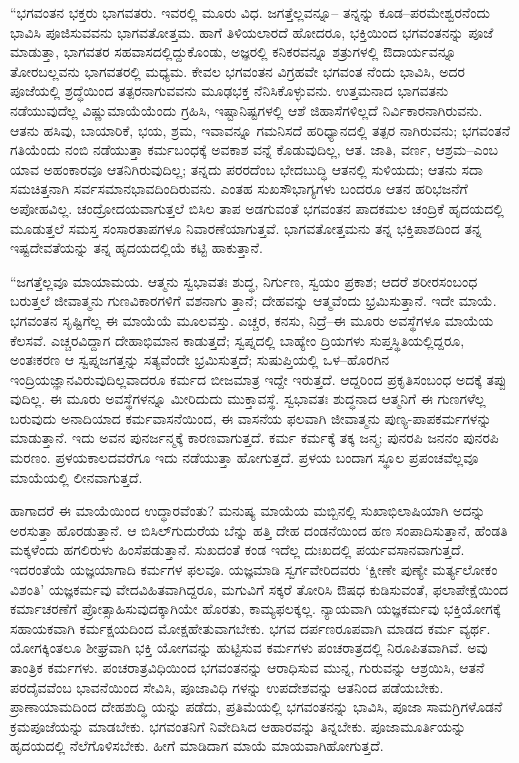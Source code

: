 “ಭಗವಂತನ ಭಕ್ತರು ಭಾಗವತರು. ಇವರಲ್ಲಿ ಮೂರು ವಿಧ. ಜಗತ್ತೆಲ್ಲವನ್ನೂ– ತನ್ನನ್ನು ಕೂಡ–ಪರಮೇಶ್ವರನೆಂದು ಭಾವಿಸಿ ಪೂಜಿಸುವವನು ಭಾಗವತೋತ್ತಮ. ಹಾಗೆ ತಿಳಿಯಲಾರದೆ ಹೋದರೂ, ಭಕ್ತಿಯಿಂದ ಭಗವಂತನನ್ನು ಪೂಜೆ ಮಾಡುತ್ತಾ, ಭಾಗವತರ ಸಹವಾಸದಲ್ಲಿದ್ದುಕೊಂಡು, ಅಜ್ಞರಲ್ಲಿ ಕನಿಕರವನ್ನೂ ಶತ್ರುಗಳಲ್ಲಿ ಔದಾರ್ಯವನ್ನೂ ತೋರಬಲ್ಲವನು ಭಾಗವತರಲ್ಲಿ ಮಧ್ಯಮ. ಕೇವಲ ಭಗವಂತನ ವಿಗ್ರಹವೇ ಭಗವಂತ ನೆಂದು ಭಾವಿಸಿ, ಅದರ ಪೂಜೆಯಲ್ಲಿ ಶ್ರದ್ಧೆಯಿಂದ ತತ್ಪರನಾಗುವವನು ಮೂಢಭಕ್ತ ನೆನಿಸಿಕೊಳ್ಳುವನು. ಉತ್ತಮನಾದ ಭಾಗವತನು ನಡೆಯುವುದೆಲ್ಲ ವಿಷ್ಣುಮಾಯೆಯೆಂದು ಗ್ರಹಿಸಿ, ಇಷ್ಟಾನಿಷ್ಟಗಳಲ್ಲಿ ಆಶೆ ಜಿಹಾಸೆಗಳಿಲ್ಲದೆ ನಿರ್ವಿಕಾರನಾಗಿರುವನು. ಆತನು ಹಸಿವು, ಬಾಯಾರಿಕೆ, ಭಯ, ಶ್ರಮ, ಇವಾವನ್ನೂ ಗಮನಿಸದೆ ಹರಿಧ್ಯಾನದಲ್ಲಿ ತತ್ಪರ ನಾಗಿರುವನು; ಭಗವಂತನೆ ಗತಿಯೆಂದು ನಂಬಿ ನಡೆಯುತ್ತಾ ಕರ್ಮಬಂಧಕ್ಕೆ ಅವಕಾಶ ವನ್ನೆ ಕೊಡುವುದಿಲ್ಲ, ಆತ. ಜಾತಿ, ವರ್ಣ, ಆಶ್ರಮ–ಎಂಬ ಯಾವ ಅಹಂಕಾರವೂ ಆತನಿಗಿರುವುದಿಲ್ಲ; ತನ್ನದು ಪರರದೆಂಬ ಭೇದಬುದ್ಧಿ ಆತನಲ್ಲಿ ಸುಳಿಯದು; ಆತನು ಸದಾ ಸಮಚಿತ್ತನಾಗಿ ಸರ್ವಸಮಾನಭಾವದಿಂದಿರುವನು. ಎಂತಹ ಸುಖಸೌಭಾಗ್ಯಗಳು ಬಂದರೂ ಆತನ ಹರಿಭಜನೆಗೆ ಅಪೋಹವಿಲ್ಲ. ಚಂದ್ರೋದಯವಾಗುತ್ತಲೆ ಬಿಸಿಲ ತಾಪ ಅಡಗುವಂತೆ ಭಗವಂತನ ಪಾದಕಮಲ ಚಂದ್ರಿಕೆ ಹೃದಯದಲ್ಲಿ ಮೂಡುತ್ತಲೆ ಸಮಸ್ತ ಸಂಸಾರತಾಪಗಳೂ ನಿವಾರಣೆಯಾಗುತ್ತವೆ. ಭಾಗವತೋತ್ತಮನು ತನ್ನ ಭಕ್ತಿಪಾಶದಿಂದ ತನ್ನ ಇಷ್ಟದೇವತೆಯನ್ನು ತನ್ನ ಹೃದಯದಲ್ಲಿಯೆ ಕಟ್ಟಿ ಹಾಕುತ್ತಾನೆ.

“ಜಗತ್ತೆಲ್ಲವೂ ಮಾಯಾಮಯ. ಆತ್ಮನು ಸ್ವಭಾವತಃ ಶುದ್ಧ, ನಿರ್ಗುಣ, ಸ್ವಯಂ ಪ್ರಕಾಶ; ಆದರೆ ಶರೀರಸಂಬಂಧ ಬರುತ್ತಲೆ ಜೀವಾತ್ಮನು ಗುಣವಿಕಾರಗಳಿಗೆ ವಶನಾಗು ತ್ತಾನೆ; ದೇಹವನ್ನು ಆತ್ಮವೆಂದು ಭ್ರಮಿಸುತ್ತಾನೆ. ಇದೇ ಮಾಯೆ. ಭಗವಂತನ ಸೃಷ್ಟಿಗೆಲ್ಲ ಈ ಮಾಯೆಯೆ ಮೂಲವಸ್ತು. ಎಚ್ಚರ, ಕನಸು, ನಿದ್ರೆ–ಈ ಮೂರು ಅವಸ್ಥೆಗಳೂ ಮಾಯೆಯ ಕೆಲಸವೆ. ಎಚ್ಚರವಿದ್ದಾಗ ದೇಹಾಭಿಮಾನ ಕಾಡುತ್ತದೆ; ಸ್ವಪ್ನದಲ್ಲಿ ಬಾಹ್ಯೇಂ ದ್ರಿಯಗಳು ಸುಪ್ತಸ್ಥಿತಿಯಲ್ಲಿದ್ದರೂ, ಅಂತಃಕರಣ ಆ ಸ್ವಪ್ನಜಗತ್ತನ್ನು ಸತ್ಯವೆಂದೇ ಭ್ರಮಿಸುತ್ತದೆ; ಸುಷುಪ್ತಿಯಲ್ಲಿ ಒಳ–ಹೊರಗಿನ ಇಂದ್ರಿಯಜ್ಞಾನವಿರುವುದಿಲ್ಲವಾದರೂ ಕರ್ಮದ ಬೀಜಮಾತ್ರ ಇದ್ದೇ ಇರುತ್ತದೆ. ಆದ್ದರಿಂದ ಪ್ರಕೃತಿಸಂಬಂಧ ಅದಕ್ಕೆ ತಪ್ಪು ವುದಿಲ್ಲ. ಈ ಮೂರು ಅವಸ್ಥೆಗಳನ್ನೂ ಮೀರಿದುದು ಮುಕ್ತಾವಸ್ಥೆ. ಸ್ವಭಾವತಃ ಶುದ್ಧನಾದ ಆತ್ಮನಿಗೆ ಈ ಗುಣಗಳೆಲ್ಲ ಬರುವುದು ಅನಾದಿಯಾದ ಕರ್ಮವಾಸನೆಯಿಂದ, ಈ ವಾಸನೆಯ ಫಲವಾಗಿ ಜೀವಾತ್ಮನು ಪುಣ್ಯ-ಪಾಪಕರ್ಮಗಳನ್ನು ಮಾಡುತ್ತಾನೆ. ಇದು ಅವನ ಪುನರ್ಜನ್ಮಕ್ಕೆ ಕಾರಣವಾಗುತ್ತದೆ. ಕರ್ಮ ಕರ್ಮಕ್ಕೆ ತಕ್ಕ ಜನ್ಮ; ಪುನರಪಿ ಜನನಂ ಪುನರಪಿ ಮರಣಂ. ಪ್ರಳಯಕಾಲದವರೆಗೂ ಇದು ನಡೆಯುತ್ತಾ ಹೋಗುತ್ತದೆ. ಪ್ರಳಯ ಬಂದಾಗ ಸ್ಥೂಲ ಪ್ರಪಂಚವೆಲ್ಲವೂ ಮಾಯೆಯಲ್ಲಿ ಲೀನವಾಗುತ್ತದೆ.

ಹಾಗಾದರೆ ಈ ಮಾಯೆಯಿಂದ ಉದ್ಧಾರವೆಂತು? ಮನುಷ್ಯ ಮಾಯೆಯ ಮಬ್ಬಿನಲ್ಲಿ ಸುಖಾಭಿಲಾಷಿಯಾಗಿ ಅದನ್ನು ಅರಸುತ್ತಾ ಹೊರಡುತ್ತಾನೆ. ಆ ಬಿಸಿಲ್​ಗುದುರೆಯ ಬೆನ್ನು ಹತ್ತಿ ದೇಹ ದಂಡನೆಯಿಂದ ಹಣ ಸಂಪಾದಿಸುತ್ತಾನೆ, ಹೆಂಡತಿ ಮಕ್ಕಳೆಂದು ಹಗಲಿರುಳು ಹಿಂಸೆಪಡುತ್ತಾನೆ. ಸುಖದಂತೆ ಕಂಡ ಇದೆಲ್ಲ ದುಃಖದಲ್ಲಿ ಪರ್ಯವಸಾನವಾಗುತ್ತದೆ. ಇದರಂತೆಯೆ ಯಜ್ಞಯಾಗಾದಿ ಕರ್ಮಗಳ ಫಲವೂ. ಯಜ್ಞಮಾಡಿ ಸ್ವರ್ಗವೇರಿದವರು ‘ಕ್ಷೀಣೇ ಪುಣ್ಯೇ ಮರ್ತ್ಯಲೋಕಂ ವಿಶಂತಿ’ ಯಜ್ಞಕರ್ಮವು ವೇದವಿಹಿತವಾಗಿದ್ದರೂ, ಮಗುವಿಗೆ ಸಕ್ಕರೆ ತೋರಿಸಿ ಔಷಧ ಕುಡಿಸುವಂತೆ, ಫಲಾಪೇಕ್ಷೆಯಿಂದ ಕರ್ಮಾಚರಣೆಗೆ ಪ್ರೋತ್ಸಾಹಿಸುವುದಕ್ಕಾಗಿಯೇ ಹೊರತು, ಕಾಮ್ಯಫಲಕ್ಕಲ್ಲ. ನ್ಯಾಯವಾಗಿ ಯಜ್ಞಕರ್ಮವು ಭಕ್ತಿಯೋಗಕ್ಕೆ ಸಹಾಯಕವಾಗಿ ಕರ್ಮಕ್ಷಯದಿಂದ ಮೋಕ್ಷಹೇತುವಾಗಬೇಕು. ಭಗವ ದರ್ಪಣರೂಪವಾಗಿ ಮಾಡದ ಕರ್ಮ ವ್ಯರ್ಥ. ಯೋಗಕ್ಕಿಂತಲೂ ಶೀಘ್ರವಾಗಿ ಭಕ್ತಿ ಯೋಗವನ್ನು ಹುಟ್ಟಿಸುವ ಕರ್ಮಗಳು ಪಂಚರಾತ್ರದಲ್ಲಿ ನಿರೂಪಿತವಾಗಿವೆ. ಅವು ತಾಂತ್ರಿಕ ಕರ್ಮಗಳು. ಪಂಚರಾತ್ರವಿಧಿಯಿಂದ ಭಗವಂತನನ್ನು ಆರಾಧಿಸುವ ಮುನ್ನ, ಗುರುವನ್ನು ಆಶ್ರಯಿಸಿ, ಆತನೆ ಪರದೈವವೆಂಬ ಭಾವನೆಯಿಂದ ಸೇವಿಸಿ, ಪೂಜಾವಿಧಿ ಗಳನ್ನು ಉಪದೇಶವನ್ನು ಆತನಿಂದ ಪಡೆಯಬೇಕು. ಪ್ರಾಣಾಯಾಮದಿಂದ ದೇಹಶುದ್ಧಿ ಯನ್ನು ಪಡೆದು, ಪ್ರತಿಮೆಯಲ್ಲಿ ಭಗವಂತನನ್ನು ಭಾವಿಸಿ, ಪೂಜಾ ಸಾಮಗ್ರಿಗಳೊಡನೆ ಕ್ರಮಪೂಜೆಯನ್ನು ಮಾಡಬೇಕು. ಭಗವಂತನಿಗೆ ನಿವೇದಿಸಿದ ಆಹಾರವನ್ನು ತಿನ್ನಬೇಕು. ಪೂಜಾಮೂರ್ತಿಯನ್ನು ಹೃದಯದಲ್ಲಿ ನೆಲೆಗೊಳಿಸಬೇಕು. ಹೀಗೆ ಮಾಡಿದಾಗ ಮಾಯೆ ಮಾಯವಾಗಿಹೋಗುತ್ತದೆ.

